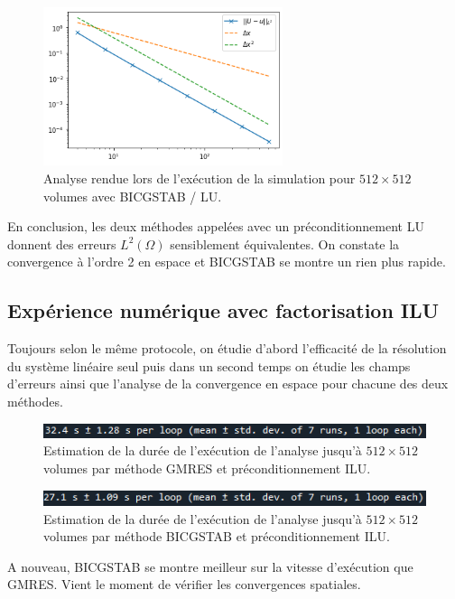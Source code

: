 \begin{figure}[htp]
    \centering
    \includegraphics[width=7cm]{Images/preliminaires/Laplace Dirichlet 2D creux GMRES Precond/analyseLU.png}
    \caption{Analyse rendue lors de l'exécution de la simulation pour $512 \times 512$ volumes avec BICGSTAB / LU.}
    \label{fig:creuxLaplacien2DBICGSTABPrecondLU}
\end{figure}

En conclusion, les deux méthodes appelées avec un préconditionnement LU donnent des erreurs $L^2(\Omega)$ sensiblement équivalentes. On constate la convergence à l'ordre 2 en espace et BICGSTAB se montre un rien plus rapide.

\newpage 

\subsection*{Expérience numérique avec factorisation ILU}

Toujours selon le même protocole, on étudie d'abord l'efficacité de la résolution du système linéaire seul puis dans un second temps on étudie les champs d'erreurs ainsi que l'analyse de la convergence en espace pour chacune des deux méthodes.

\begin{figure}[htp]
    \centering
    \includegraphics[width=12cm]{Images/preliminaires/Laplace Dirichlet 2D creux GMRES Precond/tempsILU.png}
    \caption{Estimation de la durée de l'exécution de l'analyse jusqu'à $512 \times 512$ volumes par méthode GMRES et préconditionnement ILU.}
\end{figure}

\begin{figure}[htp]
    \centering
    \includegraphics[width=12cm]{Images/preliminaires/Laplace Dirichlet 2D creux BICGSTAB Precond/tempsILU.png}
    \caption{Estimation de la durée de l'exécution de l'analyse jusqu'à $512 \times 512$ volumes par méthode BICGSTAB et préconditionnement ILU.}
\end{figure}
A nouveau, BICGSTAB se montre meilleur sur la vitesse d'exécution que GMRES. Vient le moment de vérifier les convergences spatiales.

